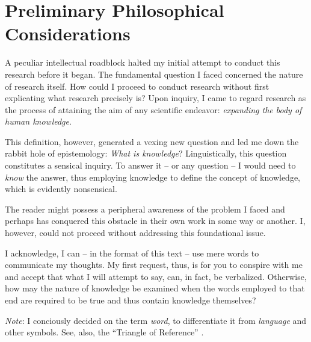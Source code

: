 

\chapter*{Preliminary Philosophical Considerations}

A peculiar intellectual roadblock halted my initial attempt to conduct this research before it began.
The fundamental question I faced concerned the nature of research itself.
How could I proceed to conduct research without first explicating what research precisely is?
Upon inquiry, I came to regard research as the process of attaining the aim of any scientific endeavor:
\textit{expanding the body of human knowledge}.

This definition, however, generated a vexing new question and led me down the rabbit hole of epistemology:
\textit{What is knowledge}?
Linguistically, this question constitutes a sensical inquiry.
To answer it -- or any question -- I would need to \textit{know} the answer, thus employing knowledge to define the concept of knowledge, which is evidently nonsensical.

The reader might possess a peripheral awareness of the problem I faced and perhaps has conquered this obstacle in their own work in some way or another.
I, however, could not proceed without addressing this foundational issue.

I acknowledge, I can -- in the format of this text -- use mere words to communicate my thoughts.
My first request, thus, is for you to conspire with me and accept that what I will attempt to say, can, in fact, be verbalized.
Otherwise, how may the nature of knowledge be examined when the words employed to that end are required to be true and thus contain knowledge themselves?

\textit{Note}: I conciously decided on the term \textit{word}, to differentiate it from \textit{language} and other symbols.
See, also, the \enquote{Triangle of Reference} \parencite{ogden-23}.

\gap


